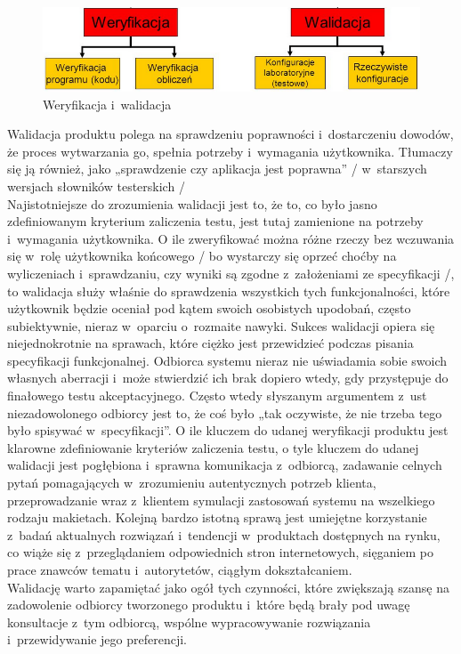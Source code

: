 \documentclass{xmgr}
\begin{document}
\begin{figure}[th!]
\centering
\includegraphics[width=.7\hsize]{images/weryfikacja_walidacja}
\caption{Weryfikacja i~walidacja\label{RYS.2}}
\end{figure}

\indent \textcolor{sb}{Walidacja produktu polega na} \textcolor{sa}{sprawdzeniu poprawności i~dostarczeniu dowodów,  że proces wytwarzania go, spełnia potrzeby i~wymagania użytkownika. Tłumaczy się ją również, jako „sprawdzenie czy aplikacja jest poprawna” / w~starszych wersjach słowników testerskich /}\cite{ALTKOM}
\\
\indent \textcolor{sb}{Najistotniejsze do zrozumienia walidacji jest to,} \textcolor{sa}{że to, co było jasno zdefiniowanym kryterium zaliczenia testu, jest tutaj zamienione na potrzeby i~wymagania użytkownika.} \textcolor{sb}{O ile zweryfikować można różne rzeczy bez wczuwania się w~rolę użytkownika końcowego / bo wystarczy się oprzeć choćby na wyliczeniach i~sprawdzaniu, czy wyniki są zgodne z~założeniami ze specyfikacji /,} \textcolor{sa}{to walidacja służy właśnie do sprawdzenia wszystkich tych funkcjonalności, które użytkownik będzie oceniał pod kątem swoich osobistych upodobań, często subiektywnie, nieraz w~oparciu o~rozmaite nawyki.}
\textcolor{sb}{Sukces walidacji opiera się niejednokrotnie na sprawach,} \textcolor{sa}{które ciężko jest przewidzieć podczas pisania specyfikacji funkcjonalnej.} \textcolor{sb}{Odbiorca systemu nieraz nie uświadamia sobie swoich własnych aberracji} \textcolor{sa}{i~może stwierdzić ich brak dopiero wtedy, gdy przystępuje do finałowego testu akceptacyjnego.} \textcolor{sb}{Często wtedy słyszanym argumentem z~ust niezadowolonego odbiorcy jest to,} \textcolor{sa}{że coś było „tak oczywiste, że nie trzeba tego było spisywać w~specyfikacji”.}
\textcolor{sb}{O ile kluczem do udanej weryfikacji produktu jest klarowne zdefiniowanie kryteriów zaliczenia testu,} \textcolor{sa}{o tyle kluczem do udanej walidacji jest pogłębiona i~sprawna komunikacja z~odbiorcą, zadawanie celnych pytań pomagających w~zrozumieniu autentycznych potrzeb klienta, przeprowadzanie wraz z~klientem symulacji zastosowań systemu na wszelkiego rodzaju makietach.} \textcolor{sb}{Kolejną bardzo istotną sprawą jest umiejętne korzystanie z~badań aktualnych rozwiązań i~tendencji w~produktach dostępnych na rynku,} \textcolor{sa}{co wiąże się z~przeglądaniem odpowiednich stron internetowych, sięganiem po prace znawców tematu i~autorytetów, ciągłym dokształcaniem.}
\\
\indent \textcolor{sb}{Walidację warto zapamiętać jako ogół tych czynności, które zwiększają szansę na zadowolenie odbiorcy tworzonego produktu i~które będą brały pod uwagę konsultacje z~tym odbiorcą,} \textcolor{sa}{wspólne wypracowywanie rozwiązania i~przewidywanie jego preferencji.}\cite{ALTKOM}
\end{document}
